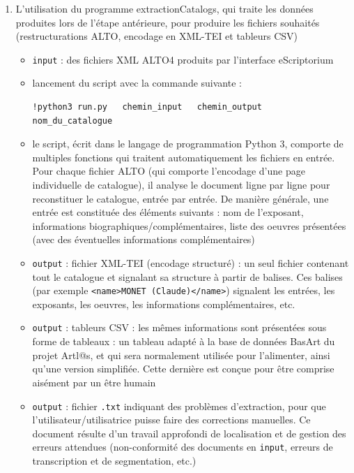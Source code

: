 \documentclass[a4paper,12pt,twoside]{book}
\begin{document}
\begin{enumerate}
	\item L'utilisation du programme extractionCatalogs, qui traite les données produites lors de l'étape antérieure, pour produire les fichiers souhaités (restructurations ALTO, encodage en XML-TEI et tableurs CSV)
	\begin{itemize}
		\item \texttt{input} : des fichiers XML ALTO4 produits par l'interface eScriptorium
		\item lancement du script avec la commande suivante :
		\begin{normalsize}
			\begin{verbatim}
!python3 run.py   chemin_input   chemin_output   nom_du_catalogue
			\end{verbatim}
		\end{normalsize}
		\item le script, écrit dans le langage de programmation Python 3, comporte de multiples fonctions qui traitent automatiquement les fichiers en entrée. Pour chaque fichier ALTO (qui comporte l'encodage d'une page individuelle de catalogue), il analyse le document ligne par ligne pour reconstituer le catalogue, entrée par entrée. De manière générale, une entrée est constituée des éléments suivants : nom de l'exposant, informations biographiques/complémentaires, liste des oeuvres présentées (avec des éventuelles informations complémentaires)
		\item \texttt{output} : fichier XML-TEI (encodage structuré) : un seul fichier contenant tout le catalogue et signalant sa structure à partir de balises. Ces balises (par exemple \texttt{<name>MONET (Claude)</name>}) signalent les entrées, les exposants, les oeuvres, les informations complémentaires, etc.		\item \texttt{output} : tableurs CSV : les mêmes informations sont présentées sous forme de tableaux : un tableau adapté à la base de données BasArt du projet Artl@s, et qui sera normalement utilisée pour l'alimenter, ainsi qu'une version simplifiée. Cette dernière est conçue pour être comprise aisément par un être humain
		\item \texttt{output} : fichier \texttt{.txt} indiquant des problèmes d'extraction, pour que l'utilisateur/utilisatrice puisse faire des corrections manuelles. Ce document résulte d'un travail approfondi de localisation et de gestion des erreurs attendues (non-conformité des documents en \texttt{input}, erreurs de transcription et de segmentation, etc.) 
	\end{itemize}
\end{enumerate}
\end{document}

